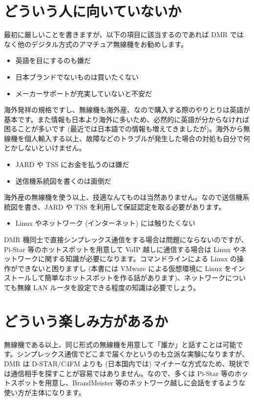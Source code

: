 \documentclass[a4j,oneside]{ujbook}
\begin{document}
\section{どういう人に向いていないか}

最初に厳しいことを書きますが、以下の項目に該当するのであれば DMR ではなく他のデジタル方式のアマチュア無線機をお勧めします。
\begin{itemize}
 \item 英語を目にするのも嫌だ
 \item 日本ブランドでないものは買いたくない
 \item メーカーサポートが充実していないと不安だ
\end{itemize}
海外発祥の規格ですし、無線機も海外産、なので購入する際のやりとりは英語が基本です。また情報も日本より海外に多いため、必然的に英語が分からなければ困ることが多いです (最近では日本語での情報も増えてきましたが)。海外から無線機を個人輸入する以上、故障などのトラブルが発生した場合の対処も自分で何とかしないといけません。
\begin{itemize}
 \item JARD や TSS にお金を払うのは嫌だ
 \item 送信機系統図を書くのは面倒だ
\end{itemize}
海外産の無線機を使う以上、技適なんてものは当然ありません。なので送信機系統図を書き、JARD や TSS を利用して保証認定を取る必要があります。
\begin{itemize}
 \item Linux やネットワーク (インターネット) には触りたくない
\end{itemize}
DMR 機同士で直接シンプレックス通信をする場合は問題にならないのですが、Pi-Star 等のホットスポットを用意して VoIP 越しに通信する場合は Linux やネットワークに関する知識が必要になります。コマンドラインによる Linux の操作ができないと困りますし (本書には VMware による仮想環境に Linux をインストールして簡単なホットスポットを作る話があります)、ネットワークについても無線 LAN ルータを設定できる程度の知識は必要でしょう。

\section{どういう楽しみ方があるか}

無線機である以上、同じ形式の無線機を用意して「誰か」と話すことは可能です。シンプレックス通信でどこまで届くかというのも立派な実験になりますが、DMR は D-STAR/C4FM よりも (日本国内では) マイナーな方式なため、現状では通信相手を探すことが容易ではありません。なので、多くは Pi-Star 等のホットスポットを用意し、BrandMeister 等のネットワーク越しに会話をするような使い方が主体になります。
\end{document}
